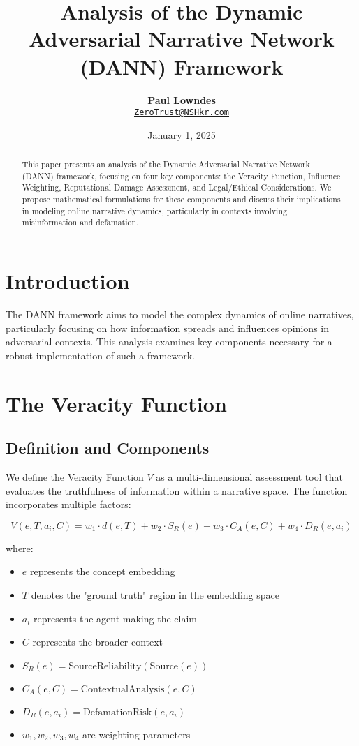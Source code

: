 \documentclass[12pt, a4paper]{article}
\title{\vspace{-2cm}\textbf{Analysis of the Dynamic Adversarial Narrative Network (DANN) Framework}}
\author{\textbf{Paul Lowndes} \\ \href{mailto:ZeroTrust@NSHkr.com}{\texttt{ZeroTrust@NSHkr.com}}}
\date{\small January 1, 2025}
\begin{document}
\maketitle
\vspace{-1.5em}


\begin{abstract}
This paper presents an analysis of the Dynamic Adversarial Narrative Network (DANN) framework, focusing on four key components: the Veracity Function, Influence Weighting, Reputational Damage Assessment, and Legal/Ethical Considerations. We propose mathematical formulations for these components and discuss their implications in modeling online narrative dynamics, particularly in contexts involving misinformation and defamation.
\end{abstract}

\section{Introduction}
The DANN framework aims to model the complex dynamics of online narratives, particularly focusing on how information spreads and influences opinions in adversarial contexts. This analysis examines key components necessary for a robust implementation of such a framework.

\section{The Veracity Function}
\subsection{Definition and Components}
We define the Veracity Function $V$ as a multi-dimensional assessment tool that evaluates the truthfulness of information within a narrative space. The function incorporates multiple factors:

\begin{equation}
V(e, T, a_i, C) = w_1 \cdot d(e, T) + w_2 \cdot S_R(e) + w_3 \cdot C_A(e, C) + w_4 \cdot D_R(e, a_i)
\end{equation}

where:
\begin{itemize}
\item $e$ represents the concept embedding
\item $T$ denotes the "ground truth" region in the embedding space
\item $a_i$ represents the agent making the claim
\item $C$ represents the broader context
\item $S_R(e) = \text{SourceReliability}(\text{Source}(e))$
\item $C_A(e, C) = \text{ContextualAnalysis}(e, C)$
\item $D_R(e, a_i) = \text{DefamationRisk}(e, a_i)$
\item $w_1, w_2, w_3, w_4$ are weighting parameters
\end{itemize}
\end{document}
